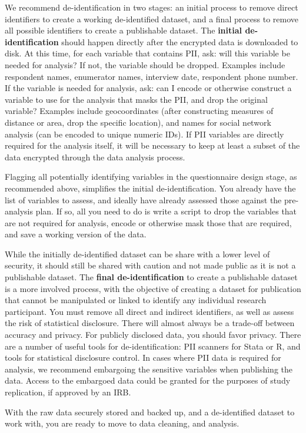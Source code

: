 We recommend de-identification in two stages: an initial process to remove direct 
identifiers to create a working de-identified dataset, and a final process to remove
all possible identifiers to create a publishable dataset. The \textbf{initial de-identification} 
should happen directly after the encrypted data is downloaded to disk. At this time, 
for each variable that contains PII, ask: will this variable be needed for analysis?
If not, the variable should be dropped. Examples include respondent names, enumerator
names, interview date, respondent phone number. If the variable is needed for analysis, 
ask: can I encode or otherwise construct a variable to use for the analysis that masks 
the PII, and drop the original variable? Examples include geocoordinates (after 
constructing measures of distance or area, drop the specific location), and names for
social network analysis (can be encoded to unique numeric IDs). If PII variables are 
directly required for the analysis itself, it will be necessary to keep at least a 
subset of the data encrypted through the data analysis process.

Flagging all potentially identifying variables in the questionnaire design stage, as 
recommended above, simplifies the initial de-identification. You already have the list 
of variables to assess, and ideally have already assessed those against the pre-analysis 
plan. If so, all you need to do is write a script to drop the variables that are not 
required for analysis, encode or otherwise mask those that are required, and save a working
version of the data.

While the initially de-identified dataset can be share with a lower level of security, 
it should still be shared with caution and not made public as it is not a publishable 
dataset. The \textbf{final de-identification} to create a publishable
dataset is a more involved process, with the objective of creating a dataset for 
publication that cannot be manipulated or linked to identify any individual research 
participant. You must remove all direct and indirect identifiers,
as well as assess the risk of statistical disclosure. There will almost always be a trade-off between accuracy and
privacy. For publicly disclosed data, you should favor privacy. There are a number of 
useful tools for de-identification: PII scanners for Stata or R, and tools for statistical disclosure control. In cases where PII data is required
for analysis, we recommend embargoing the sensitive variables when publishing the data.
Access to the embargoed data could be granted for the purposes of study replication, if approved by an IRB.

With the raw data securely stored and backed up, and a de-identified dataset to work with, you are ready to move to data cleaning, and analysis.

